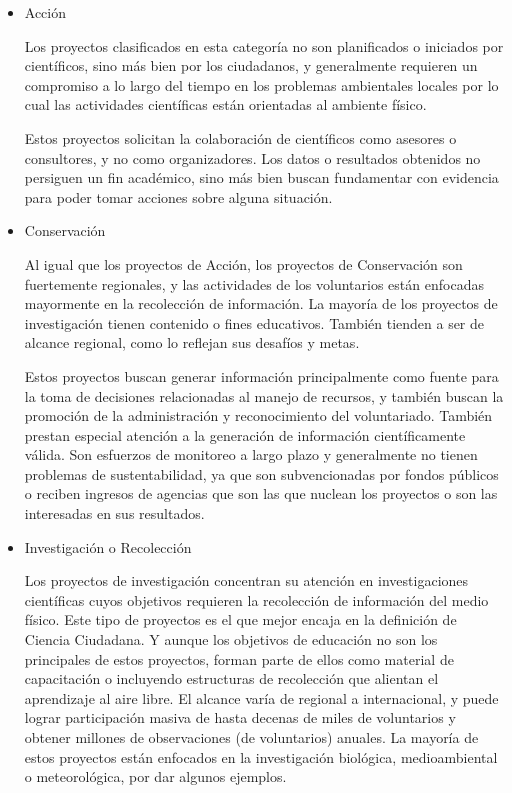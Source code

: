 \begin{itemize}
	\item {Acción}
		
		Los proyectos clasificados en esta categoría no son planificados o iniciados por científicos, sino más bien por los ciudadanos, y generalmente requieren un compromiso a lo largo del tiempo en los problemas ambientales locales por lo cual las actividades científicas están orientadas al ambiente físico. 
		
		Estos proyectos solicitan la colaboración de científicos como asesores o consultores, y no como organizadores. Los datos o resultados obtenidos no persiguen un fin académico, sino más bien buscan fundamentar con evidencia para poder tomar acciones sobre alguna situación. 
	\item {Conservación} 
	
	Al igual que los proyectos de Acción, los proyectos de Conservación son fuertemente regionales, y las actividades de los voluntarios están enfocadas mayormente en la recolección de información. La mayoría de los proyectos de investigación tienen contenido o fines educativos. También tienden a ser de alcance regional, como lo reflejan sus desafíos y metas.
	
	Estos proyectos buscan generar información principalmente como fuente para la toma de decisiones relacionadas al manejo de recursos, y también buscan la promoción de la administración y reconocimiento del voluntariado. También prestan especial atención a la generación de información científicamente válida. Son esfuerzos de monitoreo a largo plazo y generalmente no tienen problemas de sustentabilidad, ya que son subvencionadas por fondos públicos o reciben ingresos de agencias que son las que nuclean los proyectos o son las interesadas en sus resultados.
	
	\item {Investigación o Recolección} 
	
	Los proyectos de investigación concentran su atención en investigaciones científicas cuyos objetivos requieren la recolección de información del medio físico. Este tipo de proyectos es el que mejor encaja en la definición de Ciencia Ciudadana. Y aunque los objetivos de educación no son los principales de estos proyectos, forman parte de ellos como material de capacitación o incluyendo estructuras de recolección que alientan el aprendizaje al aire libre. El alcance varía de regional a internacional, y puede lograr participación masiva de hasta decenas de miles de voluntarios y obtener millones de observaciones (de voluntarios) anuales. La mayoría de estos proyectos están enfocados en la investigación biológica, medioambiental o meteorológica, por dar algunos ejemplos. 
	

\end{itemize}
